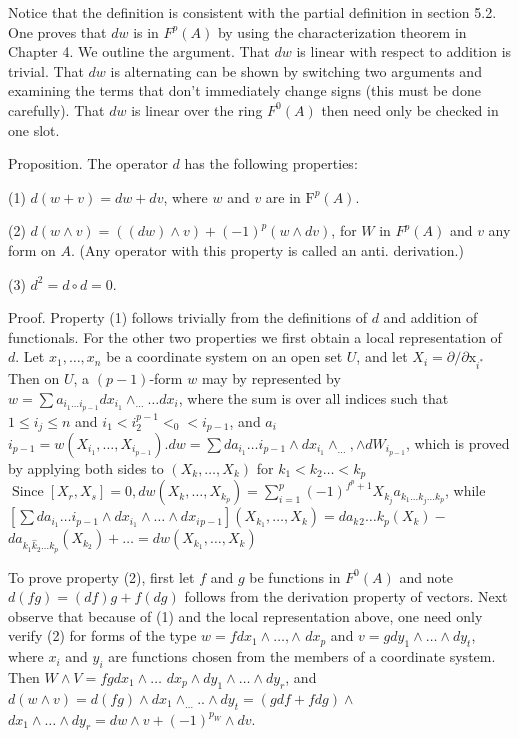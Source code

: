 \documentclass[10pt]{article}
\begin{document}
Notice that the definition is consistent with the partial definition in section 5.2. One proves that $d w$ is in $F^{p}(A)$ by using the characterization theorem in Chapter 4. We outline the argument. That $d w$ is linear with respect to addition is trivial. That $d w$ is alternating can be shown by switching two arguments and examining the terms that don't immediately change signs (this must be done carefully). That $d w$ is linear over the ring $F^{0}(A)$ then need only be checked in one slot.

Proposition. The operator $d$ has the following properties:

(1) $d(w+v)=d w+d v$, where $w$ and $v$ are in $\mathrm{F}^{p}(A)$.

(2) $d(w \wedge v)=((d w) \wedge v)+(-1)^{p}(w \wedge d v)$, for $W$ in $F^{p}(A)$ and $v$ any form on $A$. (Any operator with this property is called an anti. derivation.)

(3) $d^{2}=d \circ d=0$.

Proof. Property (1) follows trivially from the definitions of $d$ and addition of functionals. For the other two properties we first obtain a local representation of $d .$ Let $x_{1}, \ldots, x_{n}$ be a coordinate system on an open set $U$, and let $X_{i}=\partial / \partial \mathrm{x}_{i^{*}}$ Then on $U$, a $(p-1)$-form $w$ may by represented by $w=\sum a_{i_{1} \ldots i_{p-1}} d x_{i_{1}} \wedge_{\ldots} \ldots d x_{i}$, where the sum is over all indices such that $1 \leq i_{j} \leq n$ and $i_{1}<i_{2}^{p-1}<_{0}<i_{p-1}$, and $a_{i}$ $i_{p-1}=w\left(X_{i_{1}}, \ldots, X_{i_{p-1}}\right) . d w=\sum d a_{i_{1}} \ldots i_{p-1} \wedge d x_{i_{1}} \wedge_{\ldots}, \wedge d W_{i_{p-1}}$, which is proved by applying both sides to $\left(X_{k}, \ldots, X_{k}\right)$ for $k_{1}<k_{2} \ldots<k_{p}$ $\operatorname{Since}\left[X_{r}, X_{s}\right]=0, d w\left(X_{k}, \ldots, X_{k_{p}}\right)=\sum_{i=1}^{p}(-1)^{f^{p}+1} X_{k_{j}} a_{k_{1} \ldots k_{j} \ldots k_{p}}$, while $\left[\sum d a_{i_{1}} \ldots i_{p-1} \wedge d x_{i_{1}} \wedge \ldots \wedge d x_{i}{ }_{p-1}\right]\left(X_{k_{1}}, \ldots, X_{k}\right)=d a_{k}{ }_{2} \ldots k_{p}\left(X_{k}\right)-$ $d a_{k_{1} \hat{k}_{2} \ldots k_{p}}\left(X_{k_{2}}\right)+\ldots=d w\left(X_{k_{1}}, \ldots, X_{k}\right)$

To prove property (2), first let $f$ and $g$ be functions in $F^{0}(A)$ and note $d(f g)=(d f) g+f(d g)$ follows from the derivation property of vectors. Next observe that because of (1) and the local representation above, one need only verify (2) for forms of the type $w=f d x_{1} \wedge \ldots, \wedge$ $d x_{p}$ and $v=g d y_{1} \wedge \ldots \wedge d y_{t}$, where $x_{i}$ and $y_{i}$ are functions chosen from the members of a coordinate system. Then $W \wedge V=f g d x_{1} \wedge \ldots$ $d x_{p} \wedge d y_{1} \wedge \ldots \wedge d y_{r}$, and $d(w \wedge v)=d(f g) \wedge d x_{1} \wedge_{\ldots} . . \wedge d y_{t}=(g d f+f d g) \wedge$ $d x_{1} \wedge \ldots \wedge d y_{r}=d w \wedge v+(-1)^{p_{W}} \wedge d v$.
\end{document}
